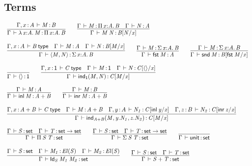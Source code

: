 \subsection{Terms}

\begin{small}
\[
\begin{array}{l}
\infer{\oftp{\Gamma}{\lam{x}{A}{M}}{\picl{x}{A}{B}}}
      {\oftp{\Gamma,\tptm{x}{A}}{M}{B}}
\qquad
\infer{\oftp{\Gamma}{\app{M}{N}}{\subst{B}{N}{x}}}
      {\oftp{\Gamma}{M}{\picl{x}{A}{B}} & \oftp{\Gamma}{N}{A}}
\\ \\
\infer{\oftp{\Gamma}{\pair{M}{N}}{\sigmacl{x}{A}{B}}}
      {\wftp{\Gamma,\tptm{x}{A}}{B} &
       \oftp{\Gamma}{M}{A} & \oftp{\Gamma}{N}{\subst{B}{M}{x}}}
\qquad
\infer{\oftp{\Gamma}{\fst{M}}{A}}
      {\oftp{\Gamma}{M}{\sigmacl{x}{A}{B}}}
\qquad
\infer{\oftp{\Gamma}{\snd{M}}{\subst{B}{\fst{M}}{x}}}
      {\oftp{\Gamma}{M}{\sigmacl{x}{A}{B}}}
\\ \\
\infer{\oftp{\Gamma}{\mt}{\unit}}
      {}
\qquad
\infer{\oftp{\Gamma}{\unitind{M}{N}}{\subst{C}{M}{x}}}
      {\wftp{\Gamma,\tptm x\unit}{C} &
       \oftp{\Gamma}{M}{\unit} & \oftp{\Gamma}{N}{\subst{C}{\mt}{x}}}
\\ \\
\infer{\oftp{\Gamma}{\inl{M}}{\sm{A}{B}}}
      {\oftp{\Gamma}{M}{A}}
\qquad
\infer{\oftp{\Gamma}{\inr{M}}{\sm{A}{B}}}
      {\oftp{\Gamma}{M}{B}}
\\ \\
\infer{\oftp{\Gamma}{\smind{\sm{A}{B}}{M}{y.N_1}{z.N_2}}{\subst{C}{M}{x}}}
      {\wftp{\Gamma,\tptm{x}{\sm{A}{B}}}{C} &
       \oftp{\Gamma}{M}{\sm{A}{B}} &
       \oftp{\Gamma,\tptm{y}{A}}{N_1}{\subst{C}{\inl{y}}{x}} &
       \oftp{\Gamma,\tptm{z}{B}}{N_2}{\subst{C}{\inr{z}}{x}}}
\\ \\
\infer{\oftp{\Gamma}{\picd{S}{T}}{\set}}
      {\oftp{\Gamma}{S}{\set} & \oftp{\Gamma}{T}{\set\to\set}} %
\qquad
\infer{\oftp{\Gamma}{\sigmacd{S}{T}}{\set}}
      {\oftp{\Gamma}{S}{\set} & \oftp{\Gamma}{T}{\set\to\set}} %
\qquad
\infer{\oftp{\Gamma}{\unitcd}{\set}}{}
\\ \\ 
\infer{\oftp{\Gamma}{\idcd{S}{M_1}{M_2}}{\set}}
      {\oftp{\Gamma}{S}{\set} &
       \oftp{\Gamma}{M_1}{\el{S}} & 
       \oftp{\Gamma}{M_2}{\el{S}}}
\qquad
\infer{\oftp{\Gamma}{\smcd{S}{T}}{\set}}
      {\oftp{\Gamma}{S}{\set} & \oftp{\Gamma}{T}{\set}}
\end{array}
\]
\end{small}

